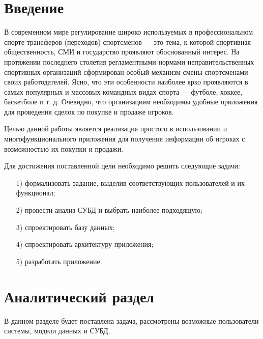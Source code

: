 
\usepackage{enumitem}
\usepackage{kosrem}
\usepackage{gensymb}







\setcounter{page}{3}

\clearpage
\tableofcontents

\clearpage
\section*{Введение}
В современном мире регулирование широко используемых в профессиональном спорте трансферов (переходов) спортсменов — это тема, к которой спортивная общественность, СМИ и государство проявляют обоснованный интерес. На протяжении последнего столетия регламентными нормами неправительственных спортивных организаций сформирован особый механизм смены спортсменами своих работодателей. Ясно, что эти особенности наиболее ярко проявляются в самых популярных и массовых командных видах спорта — футболе, хоккее, баскетболе и т. д. Очевидно, что организациям необходимы удобные приложения для проведения сделок по покупке и продаже игроков.

Целью данной работы является реализация простого в использовании и многофункционального приложения для получения информации об игроках с возможностью их покупки и продажи.

Для достижения поставленной цели необходимо решить следующие задачи:
\begin{itemize}
	\item[1)] формализовать задание, выделив соответствующих пользователей и их функционал;
	\item[2)] провести анализ СУБД и выбрать наиболее подходящую;
	\item[3)] спроектировать базу данных;
	\item[4)] спроектировать архитектуру приложения;
	\item[5)] разработать приложение.
\end{itemize}

\clearpage
\section{Аналитический раздел}
В данном разделе будет поставлена задача, рассмотрены возможные пользователи системы, модели данных и СУБД.


